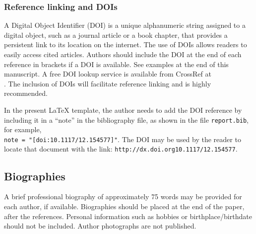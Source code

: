 \documentclass[12pt]{spieman}  %
\begin{document}
\begin{spacing}{2}

\subsubsection{Reference linking and DOIs}
A Digital Object Identifier (DOI) is a unique alphanumeric string assigned to a
digital object, such as a journal article or a book chapter, that provides a
persistent link to its location on the internet. The use of DOIs allows readers
to easily access cited articles. Authors should include the DOI at the end of
each reference in brackets if a DOI is available. See examples at the end of
this manuscript. A free DOI lookup service is available from CrossRef at
\\. The inclusion of DOIs will
facilitate reference linking and is highly recommended.

In the present LaTeX template, the author needs to add the DOI reference by
including it in a ``note'' in the bibliography file, as shown in the file
{\verb+report.bib+}, for example, \\ {\verb+note = "[doi:10.1117/12.154577]"+}.
The DOI may be used by the reader to locate that document with the link:
{\verb+http://dx.doi.org10.1117/12.154577+}.

\subsection{Biographies}
A brief professional biography of approximately 75 words may be provided for
each author, if available. Biographies should be placed at the end of the
paper, after the references. Personal information such as hobbies or
birthplace/birthdate should not be included. Author photographs are not
published.



\end{spacing}
\end{document}

